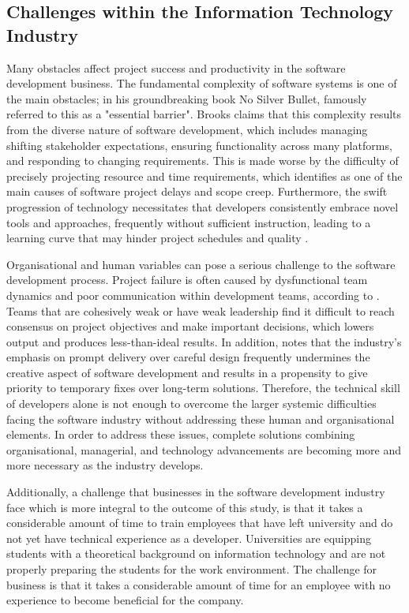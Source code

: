 \subsection{Challenges within the Information Technology Industry}
\par{Many obstacles affect project success and productivity in the software development business. The fundamental complexity of software systems is one of the main obstacles; in his groundbreaking book No Silver Bullet, \cite{brooks1987essence} famously referred to this as a "essential barrier". Brooks claims that this complexity results from the diverse nature of software development, which includes managing shifting stakeholder expectations, ensuring functionality across many platforms, and responding to changing requirements. This is made worse by the difficulty of precisely projecting resource and time requirements, which \cite{mcconnell1996rapid} identifies as one of the main causes of software project delays and scope creep. Furthermore, the swift progression of technology necessitates that developers consistently embrace novel tools and approaches, frequently without sufficient instruction, leading to a learning curve that may hinder project schedules and quality \citep{boehm1988spiral}.

Organisational and human variables can pose a serious challenge to the software development process. Project failure is often caused by dysfunctional team dynamics and poor communication within development teams, according to \cite{demarco2013peopleware}. Teams that are cohesively weak or have weak leadership find it difficult to reach consensus on project objectives and make important decisions, which lowers output and produces less-than-ideal results. In addition, \cite{glass2006software} notes that the industry's emphasis on prompt delivery over careful design frequently undermines the creative aspect of software development and results in a propensity to give priority to temporary fixes over long-term solutions. Therefore, the technical skill of developers alone is not enough to overcome the larger systemic difficulties facing the software industry without addressing these human and organisational elements. In order to address these issues, complete solutions combining organisational, managerial, and technology advancements are becoming more and more necessary as the industry develops.

Additionally, a challenge that businesses in the software development industry face which is more integral to the outcome of this study, is that it takes a considerable amount of time to train employees that have left university and do not yet have technical experience as a developer. Universities are equipping students with a theoretical background on information technology and are not properly preparing the students for the work environment. The challenge for business is that it takes a considerable amount of time for an employee with no experience to become beneficial for the company.}
